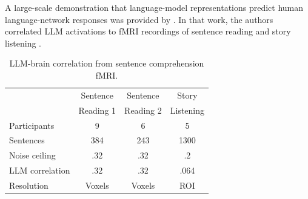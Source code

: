 \documentclass[11pt]{article}
\begin{document}
A large-scale demonstration that language-model representations predict human language-network responses was provided by  \citet{schrimpf2021neural}. In that work, the authors correlated LLM activations to fMRI recordings of sentence reading
\cite{Pereira2018} and story listening \cite{Blank2014}.
\begin{table}
\vspace{-.3cm}
\centering
\begin{tabular}{lccc}
\toprule
 & Sentence & Sentence & Story \\ 
 & Reading 1 & Reading 2 & Listening \\
\midrule
Participants & 9 & 6 & 5 \\
Sentences & 384 & 243 & 1300 \\
Noise ceiling & .32 & .32 & .2 \\
LLM correlation & .32 & .32 & .064 \\
Resolution & Voxels & Voxels & ROI \\
\bottomrule
\end{tabular}
\caption{LLM-brain correlation from sentence comprehension fMRI.}
\vspace{-.5cm}
\label{tab:sentence}
\end{table}
\end{document}
